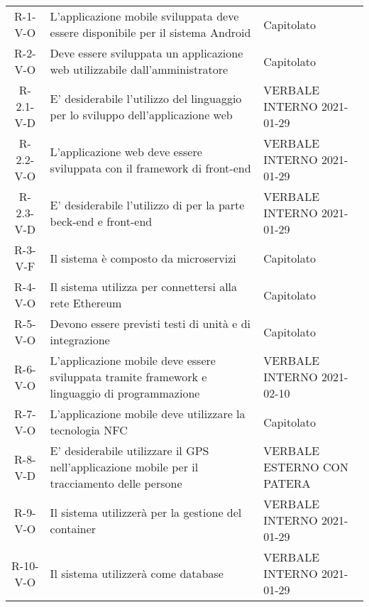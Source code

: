 \begin{longtable}{ c C{7.5cm} C{3cm} }
    R-1-V-O     & L'applicazione mobile sviluppata deve essere disponibile per il sistema Android & Capitolato\\
    R-2-V-O     & Deve essere sviluppata un applicazione web utilizzabile dall'amministratore & Capitolato\\
    R-2.1-V-D   & E' desiderabile l'utilizzo del linguaggio  per lo sviluppo dell'applicazione web & VERBALE INTERNO 2021-01-29 \\
    R-2.2-V-O   & L'applicazione web deve essere sviluppata con il framework di front-end  & VERBALE INTERNO 2021-01-29 \\
    R-2.3-V-D   & E' desiderabile l'utilizzo di  per la parte beck-end e front-end &  VERBALE INTERNO 2021-01-29 \\
    R-3-V-F     & Il sistema è composto da microservizi & Capitolato\\
    R-4-V-O     & Il sistema utilizza  per connettersi alla rete Ethereum & Capitolato\\
    R-5-V-O     & Devono essere previsti testi di unità e di integrazione & Capitolato\\
    R-6-V-O     & L'applicazione mobile deve essere sviluppata tramite framework  e linguaggio di programmazione  & VERBALE INTERNO 2021-02-10 \\
    R-7-V-O     & L'applicazione mobile deve utilizzare la tecnologia NFC & Capitolato \\
    R-8-V-D     & E' desiderabile utilizzare il GPS nell'applicazione mobile per il tracciamento delle persone & VERBALE ESTERNO CON PATERA \\
    R-9-V-O     & Il sistema utilizzerà  per la gestione del container & VERBALE INTERNO 2021-01-29 \\
    R-10-V-O    & Il sistema utilizzerà  come database & VERBALE INTERNO 2021-01-29 \\



\end{longtable}